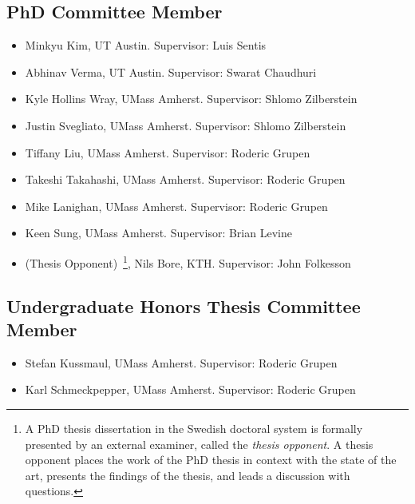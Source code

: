 \documentclass[Times]{article}
\begin{document}
\subsection*{PhD Committee Member}
\begin{itemize}
  \item Minkyu Kim, UT Austin. Supervisor: Luis Sentis
  \item Abhinav Verma, UT Austin. Supervisor: Swarat Chaudhuri
  \item Kyle Hollins Wray, UMass Amherst. Supervisor: Shlomo Zilberstein
  \item Justin Svegliato, UMass Amherst. Supervisor: Shlomo Zilberstein
  \item Tiffany Liu, UMass Amherst. Supervisor: Roderic Grupen
  \item Takeshi Takahashi, UMass Amherst. Supervisor: Roderic Grupen
  \item Mike Lanighan, UMass Amherst. Supervisor: Roderic Grupen
  \item Keen Sung, UMass Amherst. Supervisor: Brian Levine
  \item (Thesis Opponent)~\footnote{A PhD thesis dissertation in the Swedish
  doctoral system
is formally presented by an external examiner, called the \emph{thesis
opponent}. A thesis opponent places the work of the PhD thesis in context with
the state of the art, presents the findings of the thesis, and leads a
discussion with questions.}, Nils Bore, KTH. Supervisor: John Folkesson
\end{itemize}

\subsection*{Undergraduate Honors Thesis Committee Member}
\begin{itemize}
  \item Stefan Kussmaul, UMass Amherst. Supervisor: Roderic Grupen
  \item Karl Schmeckpepper, UMass Amherst. Supervisor: Roderic Grupen
\end{itemize}


\nocite{*}
\printbibheading
\bibbycategory
\end{document}
